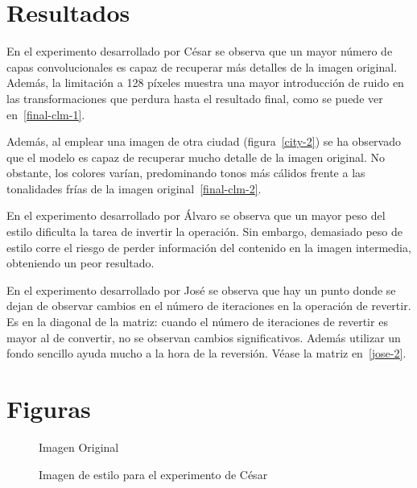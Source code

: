 \documentclass[es]{uc3mreport}
\begin{document}
\begin{report}
        \section{Resultados}

            En el experimento desarrollado por César se observa que un mayor
            número de capas convolucionales es capaz de recuperar más detalles
            de la imagen original. Además, la limitación a 128 píxeles muestra
            una mayor introducción de ruido en las transformaciones que perdura
            hasta el resultado final, como se puede ver en~\ref{final-clm-1}.

            Además, al emplear una imagen de otra ciudad (figura~\ref{city-2})
            se ha observado que el modelo es capaz de recuperar mucho detalle
            de la imagen original. No obstante, los colores varían,
            predominando tonos más cálidos frente a las tonalidades frías de la
            imagen original~\ref{final-clm-2}.

            En el experimento desarrollado por Álvaro se observa que un mayor
            peso del estilo dificulta la tarea de invertir la operación. Sin
            embargo, demasiado peso de estilo corre el riesgo de perder información
            del contenido en la imagen intermedia, obteniendo un peor resultado.

            En el experimento desarrollado por José se observa que hay un
            punto donde se dejan de observar cambios en el número de
            iteraciones en la operación de revertir. Es en la diagonal de la
            matriz: cuando el número de iteraciones de revertir es mayor al de
            convertir, no se observan cambios significativos. Además utilizar
            un fondo sencillo ayuda mucho a la hora de la reversión. Véase la
            matriz en~\ref{jose-2}.


    \section{Figuras}

    \begin{figure}
        \caption{Imagen Original}
        \label{original}
    \end{figure}

    \begin{figure}
        \caption{Imagen de estilo para el experimento de César}
        \label{joan-miro}
    \end{figure}


\end{report}
\end{document}
